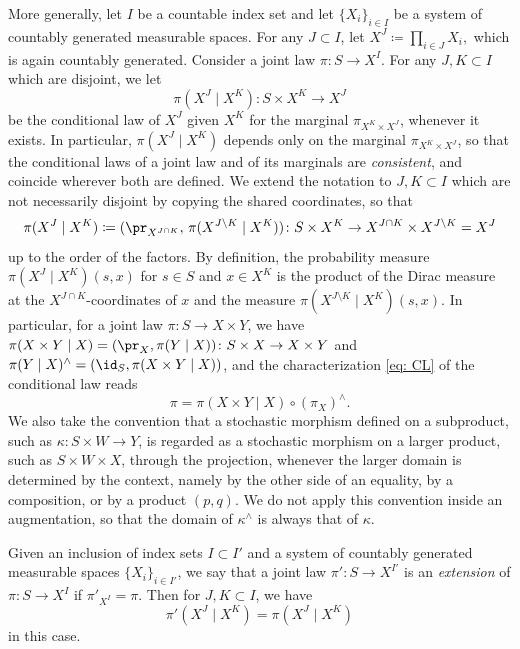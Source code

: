 \documentclass[12pt,reqno]{amsart}%
\theoremstyle{plain}
\theoremstyle{definition}
\begin{document}
More generally, let $I$ be a countable index set and let $\{X_i\}_{i\in I}$ be a system of countably generated measurable spaces.
For any $J\subset I$, let
$
	X^J\coloneqq\prod_{i\in J}X_i,
$
which is again countably generated.
Consider a joint law
$
	\pi\colon S\rightarrow X^I.
$
For any $J,K\subset I$ which are disjoint, we let
\[
	\pi(X^J\mid X^K)\colon S\times X^K\rightarrow X^J
\]
be the conditional law of $X^J$ given $X^K$ for the marginal $\pi_{X^K\times X^J}$, whenever it exists.
In particular, $\pi(X^J\mid X^K)$ depends only on the marginal $\pi_{X^K\times X^J}$,
so that the conditional laws of a joint law and of its marginals are \emph{consistent},
and coincide wherever both are defined.
We extend the notation to $J,K\subset I$ which are not necessarily disjoint by copying the shared coordinates, so that
\[
	\pi(X^J\mid X^K)\coloneqq(\pr_{X^{J\cap K}},\,\pi(X^{J\setminus K}\mid X^K))\colon S\times X^K\rightarrow X^{J\cap K}\times X^{J\setminus K}=X^J
\]
up to the order of the factors. 
By definition,
the probability measure $\pi(X^J\mid X^K)(s,x)$ 
for $s\in S$ and $x\in X^K$
is the product of the Dirac measure at the $X^{J\cap K}$-coordinates of $x$
and the measure $\pi(X^{J\setminus K}\mid X^K)(s,x)$.
In particular, for a joint law $\pi\colon S\rightarrow X\times Y$, we have
$\pi(X\times Y\mid X)=(\pr_X,\pi(Y\mid X))\colon S\times X\rightarrow X\times Y$ and $\pi(Y\mid X)^\wedge=(\id_S,\pi(X\times Y\mid X))$,
and the characterization \eqref{eq: CL} of the conditional law reads
\begin{equation}\label{eq: CL copy}
	\pi=\pi(X\times Y\mid X)\circ(\pi_X)^\wedge.
\end{equation}
We also take the convention that a stochastic morphism defined on a subproduct, such as $\kappa\colon S\times W\rightarrow Y$,
is regarded as a stochastic morphism on a larger product, such as $S\times W\times X$, through the projection,
whenever the larger domain is determined by the context, namely by the other side of an equality,
by a composition, or by a product $(p,q)$.
We do not apply this convention inside an augmentation, so that the domain of $\kappa^\wedge$ is always that of $\kappa$.

Given an inclusion of index sets $I\subset I'$
and a system of countably generated measurable spaces $\{X_i\}_{i\in I'}$,
we say that a joint law $\pi'\colon S\rightarrow X^{I'}$ is an \emph{extension}
of $\pi\colon S\rightarrow X^{I}$ if $\pi'_{X^{I}}=\pi$.
Then for $J,K\subset I$, we have
\[
	\pi'(X^J\mid X^K)=\pi(X^J\mid X^K)
\]
in this case.
\end{document}
